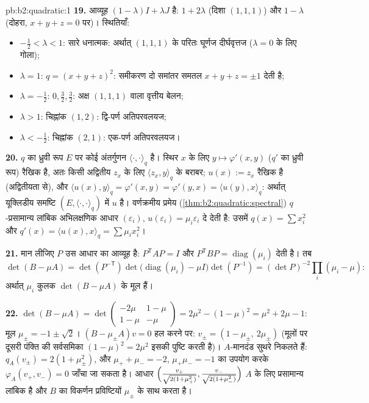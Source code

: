 \begin{solution}{pb:b2:quadratic:1}
\textbf{19.} आव्यूह $(1-\lambda)I + \lambda J$ है:  $1 + 2\lambda$ (दिशा $(1,1,1)$) और $1 -
\lambda$ (दोहरा,
$x + y + z = 0$ पर)। स्थितियाँ:
\begin{itemize}
  \item $-\frac12 < \lambda < 1$: सारे  धनात्मक: अर्थात् $(1,1,1)$ के परितः घूर्णज
        दीर्घवृत्तज ($\lambda = 0$ के लिए गोला);
  \item $\lambda = 1$: $q = (x+y+z)^2$: समीकरण दो समांतर समतल $x + y + z = \pm1$ देती है;
  \item $\lambda = -\frac12$:  $0, \frac32,
        \frac32$: अक्ष $(1,1,1)$ वाला वृत्तीय बेलन;
  \item $\lambda > 1$: चिह्नांक $(1, 2)$: द्वि-पर्ण अतिपरवलयज;
  \item $\lambda < -\frac12$: चिह्नांक $(2, 1)$: एक-पर्ण अतिपरवलयज।
\end{itemize}

\textbf{20.} $q$ का ध्रुवी रूप $E$ पर कोई अंतर्गुणन $\langle\cdot,\cdot\rangle_q$ है। स्थिर $x$ के
लिए $y \mapsto
\varphi'(x, y)$ ($q'$ का ध्रुवी रूप) रैखिक है, अतः किसी अद्वितीय $z_x$ के लिए $\langle z_x, y\rangle_q$ के
बराबर; $u(x) := z_x$ रैखिक है (अद्वितीयता से), और $\langle u(x), y\rangle_q =
\varphi'(x,y) = \varphi'(y,x) = \langle u(y), x\rangle_q$: अर्थात् यूक्लिडीय समष्टि
$(E,
\langle\cdot,\cdot\rangle_q)$ में $u$  है। वर्णक्रमीय प्रमेय (\cref{thm:b2:quadratic:spectral}) $q$-प्रसामान्य लांबिक
अभिलक्षणिक आधार $(\varepsilon_i)$, $u(\varepsilon_i) =
\mu_i\varepsilon_i$ दे देती है: उसमें $q(x) = \sum x_i^2$ और $q'(x) =
\langle u(x), x\rangle_q = \sum\mu_ix_i^2$।

\textbf{21.} मान लीजिए $P$ उस आधार का आव्यूह है:  $P^{\mathsf T}AP = I$ और $P^{\mathsf T}BP =
\operatorname{diag}(\mu_i)$
देती है। तब
\[
\det(B - \mu A) = \det(P^{-\mathsf T})
\det\bigl(\operatorname{diag}(\mu_i) - \mu I\bigr)
\det(P^{-1})
= (\det P)^{-2}\prod_i(\mu_i - \mu) :
\]
अर्थात् $\mu_i$ कुलक $\det(B - \mu A)$ के मूल हैं।

\textbf{22.} $\det(B - \mu A) =
\det\begin{pmatrix} -2\mu & 1-\mu\\ 1-\mu & -\mu\end{pmatrix}
= 2\mu^2 - (1-\mu)^2 = \mu^2 + 2\mu - 1$: मूल $\mu_\pm = -1
\pm \sqrt2$। $(B - \mu_\pm A)v = 0$ हल करने पर: $v_\pm = (1 -
\mu_\pm,\ 2\mu_\pm)$ (मूलों पर दूसरी पंक्ति की
सर्वसमिका $(1-\mu)^2 =
2\mu^2$ इसकी पुष्टि करती है)। $A$-मानदंड सुथरे निकलते हैं: $q_A(v_\pm) = 2(1 + \mu_\pm^2)$, और
$\mu_+ + \mu_- = -2$, $\mu_+\mu_- = -1$ का उपयोग करके $\varphi_A(v_+, v_-) = 0$ जाँचा जा सकता है। आधार $\Bigl(\frac{v_+}{\sqrt{2(1 +
\mu_+^2)}}, \frac{v_-}{\sqrt{2(1+\mu_-^2)}}\Bigr)$ $A$ के लिए
प्रसामान्य लांबिक है और $B$ का विकर्णन प्रविष्टियों $\mu_\pm$ के साथ करता है।


\end{solution}
